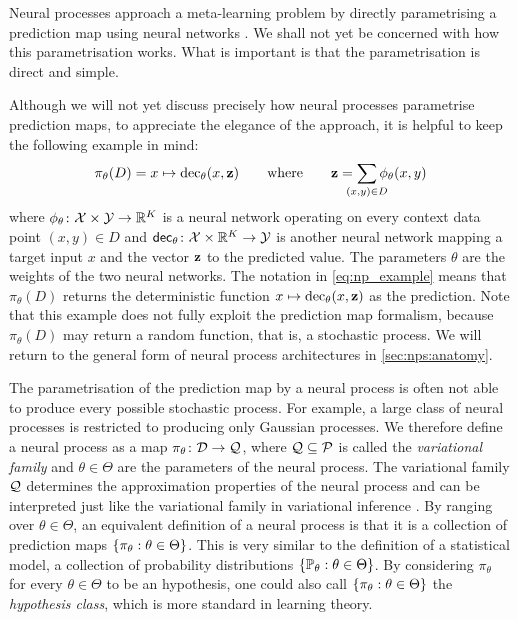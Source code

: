 \documentclass[12pt, twoside]{report}
\begin{document}
Neural processes \parencite{Garnelo:2018:Conditional_Neural_Processes,Garnelo:2018:Neural_Processes}
approach a meta-learning problem by directly parametrising a prediction map using neural networks \parencite{McCulloch:1943:A_Logical_Calculus_of_Ideas,Rosenblatt:1958:The_Perceptron_A_Probabilistic_Model,Ivakhnenko:1965:Cybernetic_Predicting_Devices,Fukushima:1982:Neocognitron_A_Self-Organizing_Neural_Network,Werbos:1982:Applications_of_Advances_in_Nonlinear,LeCun:1989:Backpropagation_Applied_to_Handwritten_Zip}.
We shall not yet be concerned with how this parametrisation works.
What is important is that the parametrisation is direct and simple.

Although we will not yet discuss precisely how neural processes parametrise prediction maps, to appreciate the elegance of the approach, it is helpful to keep the following example in mind:
\begin{equation} \label{eq:np_example}
    \pi_\theta(D) = x \mapsto \operatorname{dec}_\theta(x, \vz)
    \qquad \text{where} \qquad
    \vz = \sum_{\mathclap{(x, y) \in D}} \phi_\theta(x, y)
\end{equation}
where
$\phi_\theta \colon \mathcal{X} \times \mathcal{Y} \to \mathbb{R}^K$ is a neural network operating on every context data point $(x, y) \in D$ and
$\mathsf{dec}_\theta \colon \mathcal{X} \times \mathbb{R}^K \to \mathcal{Y}$ is another neural network mapping a target input $x$ and the vector $\mathbf{z} $ to the predicted value.
The parameters $\theta$ are the weights of the two neural networks.
The notation in \eqref{eq:np_example} means that $\pi_\theta(D)$ returns the deterministic function $x \mapsto \operatorname{dec}_\theta(x, \mathbf{z})$ as the prediction.
Note that this example does not fully exploit the prediction map formalism, because $\pi_\theta(D)$ may return a random function, that is, a stochastic process.
We will return to the general form of neural process architectures in \cref{sec:nps:anatomy}.

The parametrisation of the prediction map by a neural process is often not able to produce every possible stochastic process. 
For example, a large class of neural processes is restricted to producing only Gaussian processes.
We therefore define a neural process as a map $\pi_\theta \colon \mathcal{D} \to \mathcal{Q}$, where $\mathcal{Q} \subseteq \mathcal{P}$ is called the \emph{variational family} and $\theta \in \Theta$ are the parameters of the neural process.
The variational family $\mathcal{Q}$ determines the approximation properties of the neural process and can be interpreted just like the variational family in variational inference \parencite{Wainwright:2008:Graphical_Models_Exponential_Families_and}.
By ranging over $\theta \in \Theta$, an equivalent definition of a neural process is that it is a collection of prediction maps $\{\pi_\theta : \theta \in \Theta\}$.
This is very similar to the definition of a statistical model, a collection of probability distributions $\{\mathbb{P}_\theta : \theta \in \Theta\}$.
By considering $\pi_\theta$ for every $\theta \in \Theta$ to be an hypothesis, one could also call $\{\pi_\theta : \theta \in \Theta\}$ the \emph{hypothesis class}, which is more standard in learning theory.
\end{document}
